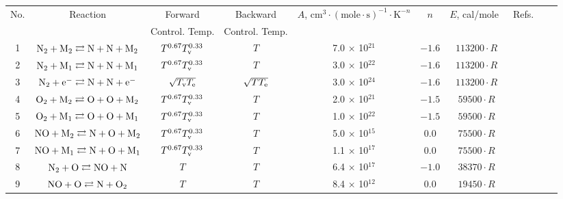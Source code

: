 \documentclass{warpdoc}
\renewcommand{\fontsizetable}{\footnotesize\scalefont{0.9}}
\begin{document}
%
\begin{table}[t]
\fontsizetable
\begin{center}
\begin{threeparttable}
\begin{tabular}{cccccccccc} 
\toprule
\multirow{2}{*}{No.} & \multirow{2}{*}{Reaction\tnote{(b)}} & Forward & Backward   & \multirow{2}{*}{$A$, $\textrm{cm}^3\cdot(\textrm{mole}\cdot \textrm{s})^{-1}\cdot \textrm{K}^{-n}$} & \multirow{2}{*}{$n$} & \multirow{2}{*}{$E$, cal/mole~\tnote{(a)}} & \multirow{2}{*}{Refs.}\\
 & & Control. Temp. & Control. Temp.&  &  &  & \\ 
\midrule
1 & $\rm N_2 + M_2 \rightleftarrows N + N + M_2$ & $T^{0.67} T_{\rm v}^{0.33}$ & $T$ & 7.0 $\times$ 10$^{21}$  & $-1.6$ & $113200 \cdot R$ & \cite{book:1990:park,jtht:2013:farbar}\\
2 & $\rm N_2 + M_1 \rightleftarrows N + N + M_1$ & $T^{0.67} T_{\rm v}^{0.33}$ & $T$ & 3.0 $\times$ 10$^{22}$  & $-1.6$ & $113200 \cdot R$ & \cite{book:1990:park,jtht:2013:farbar}\\
3 & $\rm N_2 + e^- \rightleftarrows N + N + e^-$ & $\sqrt{T_{\rm v} T_{\rm e}}$ & $\sqrt{T T_{\rm e}}$ & 3.0 $\times$ 10$^{24}$  & $-1.6$ & $113200 \cdot R$ & \cite{book:1990:park}\\
4 & $\rm O_2 + M_2 \rightleftarrows O + O + M_2$ & $T^{0.67} T_{\rm v}^{0.33}$ & $T$ & 2.0 $\times$ 10$^{21}$  & $-1.5$ & $59500 \cdot R$ & \cite{book:1990:park,jtht:2013:farbar}\\
5 & $\rm O_2 + M_1 \rightleftarrows O + O + M_1$ & $T^{0.67} T_{\rm v}^{0.33}$ & $T$ & 1.0 $\times$ 10$^{22}$  & $-1.5$ & $59500 \cdot R$ & \cite{book:1990:park,jtht:2013:farbar}\\
6 & $\rm NO + M_2 \rightleftarrows N + O + M_2$ & $T^{0.67} T_{\rm v}^{0.33}$ & $T$ & 5.0 $\times$ 10$^{15}$  & 0.0 & $75500 \cdot R$ & \cite{book:1990:park,jtht:2013:farbar}\\
7 & $\rm NO + M_1 \rightleftarrows N + O + M_1$ & $T^{0.67} T_{\rm v}^{0.33}$ & $T$ & 1.1 $\times$ 10$^{17}$  & 0.0 & $75500 \cdot R$ & \cite{book:1990:park,jtht:2013:farbar}\\
8 & $\rm N_2 + O \rightleftarrows NO + N $ & $T$ & $T$ & 6.4 $\times$ 10$^{17}$  & $-1.0$ & $38370 \cdot R$ & \cite{jcp:1996:bose}\\
9 & $\rm NO + O \rightleftarrows N + O_2 $ & $T$ & $T$ & 8.4 $\times$ 10$^{12}$  & 0.0 & $19450 \cdot R$ & \cite{book:1990:park}\\

\end{tabular}
\end{threeparttable}
\end{center}
\end{table}
\end{document}
